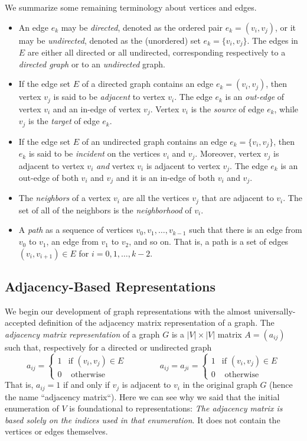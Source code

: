 We summarize some remaining terminology about vertices and edges.
\begin{itemize}
\item 
An edge $e_k$ may  be \emph{directed}, denoted as the ordered pair $e_k=(v_i, v_j)$, or it may be
  \emph{undirected}, denoted as the (unordered) set $e_k=\{v_i, v_j\}$.  The edges 
in $E$ are either all directed or all undirected,
  corresponding respectively to a \emph{directed graph} or to an \emph{undirected} graph.
\item 
If the edge set $E$ of a directed graph contains an edge $e_k = (v_i,v_j)$, then
  vertex $v_j$ is said to be \emph{adjacent} to vertex $v_i$.  The edge $e_k$ is an
  \emph{out-edge} of vertex $v_i$ and an in-edge of vertex $v_j$.  Vertex $v_i$ is the \emph{source} of
  edge $e_k$, while $v_j$ is the \emph{target} of edge $e_k$.
\item If the edge set $E$ of an undirected graph contains an edge $e_k = \{v_i,v_j\}$, then
  $e_k$ is said to be \emph{incident} on the vertices $v_i$ and $v_j$.
  Moreover, vertex $v_j$ is adjacent to vertex $v_i$
  \emph{and} vertex $v_i$ is adjacent to vertex $v_j$.
  The edge $e_k$ is an out-edge of both $v_i$ and $v_j$ and it is an in-edge of both $v_i$ and $v_j$.
\item The \emph{neighbors} of a vertex $v_i$ are all the vertices $v_j$ that are adjacent to $v_i$.  The set of all of the neighbors is the \emph{neighborhood} of $v_i$.
\item A \emph{path} as a sequence of vertices $v_0, v_1, \ldots, v_{k-1}$ such that
there is an edge from $v_0$ to $v_1$, an edge from $v_1$ to $v_2$, and so on.
That is, a path is a set of edges $(v_i, v_{i+1}) \in E$ for  $i = 0, 1, \ldots, k-2$.
\end{itemize}


\subsection{Adjacency-Based Representations}

We begin our development of graph representations
with the almost universally-accepted definition of the
adjacency matrix representation of a graph.
%
The \emph{adjacency matrix representation} of a graph $G$ is a $|V|\times |V|$ matrix $A = (a_{ij})$ such that,
respectively for a directed or undirected graph
\[
 a_{i j} = 
 \left\{
 \begin{array}{rl}
  1 & \textrm{if } (v_i, v_j) \in E \\
  0 & \textrm { otherwise }
 \end{array}
 \right.
 \qquad\qquad
 a_{i j} = a_{ji} =
 \left\{
 \begin{array}{rl}
  1 & \textrm{if } (v_i, v_j) \in E \\ 
  0 & \textrm { otherwise }
 \end{array}
 \right.
\]
That is, $a_{ij} = 1$ if and only if $v_j$ is adjacent to $v_i$ in the original graph $G$ (hence the name ``adjacency matrix``).
%
Here we can see why we said that the initial enumeration of $V$ is foundational to representations:  \emph{The adjacency matrix is based solely on the indices used in that enumeration}.  It does not contain the vertices or edges themselves.

